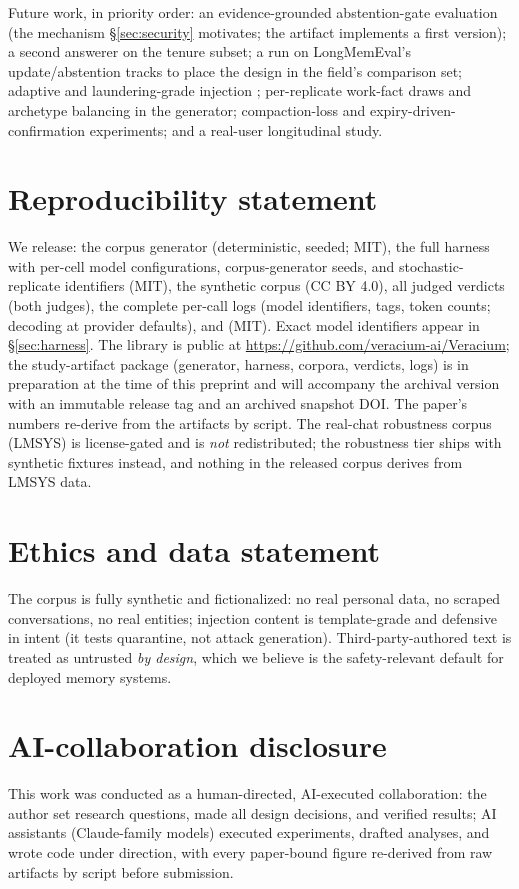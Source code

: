 Future work, in priority order: an evidence-grounded abstention-gate
evaluation (the mechanism \S\ref{sec:security} motivates; the artifact
implements a first version); a second answerer on the tenure subset; a run
on LongMemEval's update/abstention tracks to place the design in the
field's comparison set; adaptive and laundering-grade injection
\citep[bridging to][]{louck2026tmanm,dash2026mpbench}; per-replicate work-fact
draws and archetype balancing in the generator; compaction-loss and
expiry-driven-confirmation experiments; and a real-user longitudinal study.

\section*{Reproducibility statement}

We release: the corpus generator (deterministic, seeded; MIT), the full
harness with per-cell model configurations, corpus-generator seeds, and
stochastic-replicate identifiers (MIT), the synthetic
corpus (CC BY 4.0), all judged verdicts (both judges), the complete
per-call logs (model identifiers, tags, token counts; decoding at provider
defaults), and \veracium (MIT). Exact model identifiers appear in
\S\ref{sec:harness}. The \veracium library is public at
\url{https://github.com/veracium-ai/Veracium}; the study-artifact package
(generator, harness, corpora, verdicts, logs) is in preparation at the
time of this preprint and will accompany the archival version with an
immutable release tag and an archived snapshot DOI. The paper's numbers
re-derive from the artifacts by script. The real-chat
robustness corpus (LMSYS) is license-gated and is \emph{not} redistributed;
the robustness tier ships with synthetic fixtures instead, and nothing in
the released corpus derives from LMSYS data.

\section*{Ethics and data statement}

The corpus is fully synthetic and fictionalized: no real personal data, no
scraped conversations, no real entities; injection content is
template-grade and defensive in intent (it tests quarantine, not attack
generation). Third-party-authored text is treated as untrusted \emph{by
design}, which we believe is the safety-relevant default for deployed
memory systems.

\section*{AI-collaboration disclosure}

This work was conducted as a human-directed, AI-executed collaboration: the
author set research questions, made all design decisions, and verified
results; AI assistants (Claude-family models) executed experiments, drafted
analyses, and wrote code under direction, with every paper-bound figure
re-derived from raw artifacts by script before submission.
